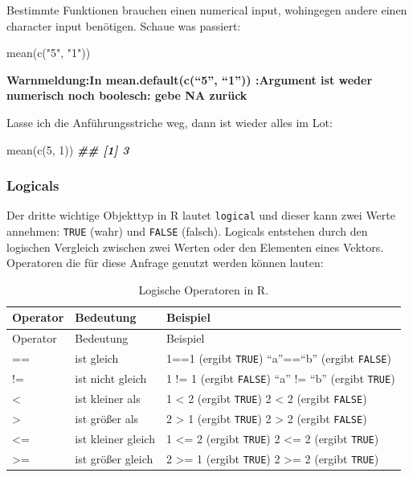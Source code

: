 \documentclass[
]{article}
\newenvironment{Shaded}{\begin{snugshade}}{\end{snugshade}}
\newcommand{\DecValTok}[1]{\textcolor[rgb]{0.00,0.00,0.81}{#1}}
\newcommand{\DocumentationTok}[1]{\textcolor[rgb]{0.56,0.35,0.01}{\textbf{\textit{#1}}}}
\newcommand{\FunctionTok}[1]{\textcolor[rgb]{0.00,0.00,0.00}{#1}}
\newcommand{\NormalTok}[1]{#1}
\newcommand{\StringTok}[1]{\textcolor[rgb]{0.31,0.60,0.02}{#1}}
\begin{document}
Bestimmte Funktionen brauchen einen numerical input, wohingegen andere einen character input benötigen. Schaue was passiert:

\begin{Shaded}
\begin{Highlighting}[]
\FunctionTok{mean}\NormalTok{(}\FunctionTok{c}\NormalTok{(}\StringTok{"5"}\NormalTok{, }\StringTok{"1"}\NormalTok{))}
\end{Highlighting}
\end{Shaded}

\textbf{Warnmeldung:In mean.default(c(``5'', ``1'')) :Argument ist weder numerisch noch boolesch: gebe NA zurück}

Lasse ich die Anführungsstriche weg, dann ist wieder alles im Lot:

\begin{Shaded}
\begin{Highlighting}[]
\FunctionTok{mean}\NormalTok{(}\FunctionTok{c}\NormalTok{(}\DecValTok{5}\NormalTok{, }\DecValTok{1}\NormalTok{))}
\DocumentationTok{\#\# [1] 3}
\end{Highlighting}
\end{Shaded}

\hypertarget{logicals}{%
\subsubsection{Logicals}\label{logicals}}

Der dritte wichtige Objekttyp in R lautet \texttt{logical} und dieser kann zwei Werte annehmen: \texttt{TRUE} (wahr) und \texttt{FALSE} (falsch). Logicals entstehen durch den logischen Vergleich zwischen zwei Werten oder den Elementen eines Vektors. Operatoren die für diese Anfrage genutzt werden können lauten:

\begin{longtable}[]{@{}lll@{}}
\caption{Logische Operatoren in R.}\tabularnewline
\toprule
Operator & Bedeutung & Beispiel \\
\midrule
\endfirsthead
\toprule
Operator & Bedeutung & Beispiel \\
\midrule
\endhead
== & ist gleich & 1==1 (ergibt \texttt{TRUE}) ``a''==``b'' (ergibt \texttt{FALSE}) \\
!= & ist nicht gleich & 1 != 1 (ergibt \texttt{FALSE}) ``a'' != ``b'' (ergibt \texttt{TRUE}) \\
\textless{} & ist kleiner als & 1 \textless{} 2 (ergibt \texttt{TRUE}) 2 \textless{} 2 (ergibt \texttt{FALSE}) \\
\textgreater{} & ist größer als & 2 \textgreater{} 1 (ergibt \texttt{TRUE}) 2 \textgreater{} 2 (ergibt \texttt{FALSE}) \\
\textless= & ist kleiner gleich & 1 \textless= 2 (ergibt \texttt{TRUE}) 2 \textless= 2 (ergibt \texttt{TRUE}) \\
\textgreater= & ist größer gleich & 2 \textgreater= 1 (ergibt \texttt{TRUE}) 2 \textgreater= 2 (ergibt \texttt{TRUE}) \\
\bottomrule
\end{longtable}
\end{document}
